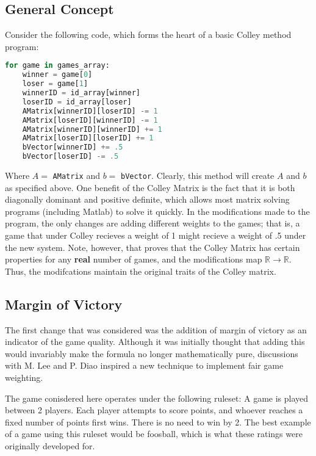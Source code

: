 \documentclass[12pt, letterpaper]{article}
\begin{document}
\subsection{General Concept}

Consider the following code, which forms the heart of a basic Colley method program:
\begin{lstlisting}[language=python]
for game in games_array:
    winner = game[0]
    loser = game[1]
    winnerID = id_array[winner]
    loserID = id_array[loser]
    AMatrix[winnerID][loserID] -= 1
    AMatrix[loserID][winnerID] -= 1
    AMatrix[winnerID][winnerID] += 1
    AMatrix[loserID][loserID] += 1
    bVector[winnerID] += .5
    bVector[loserID] -= .5
\end{lstlisting}

Where $A=$ \texttt{AMatrix} and $b=$ \texttt{bVector}.  Clearly, this method will create $A$ and $b$ as specified above.  One benefit of the Colley Matrix is the fact that it is both diagonally dominant and positive definite, which allows most matrix solving programs (including Matlab) to solve it quickly.  In the modifications made to the program, the only changes are adding different weights to the games; that is, a game that under Colley recieves a weight of 1 might recieve a weight of .5 under the new system.  Note, however, that \cite{colley02} proves that the Colley Matrix has certain properties for any \textbf{real} number of games, and the modifications map $\mathbb{R} \rightarrow \mathbb{R}$.  Thus, the modifcations maintain the original traits of the Colley matrix. 

\subsection{Margin of Victory}

\par The first change that was considered was the addition of margin of victory as an indicator of the game quality.  Although it was initially thought that adding this would invariably make the formula no longer mathematically pure, discussions with M. Lee and P. Diao inspired a new technique to implement fair game weighting.

\par The game conisdered here operates under the following ruleset: A game is played between 2 players.  Each player attempts to score points, and whoever reaches a fixed number of points first wins.  There is no need to win by 2.  The best example of a game using this ruleset would be foosball, which is what these ratings were originally developed for.
\end{document}
